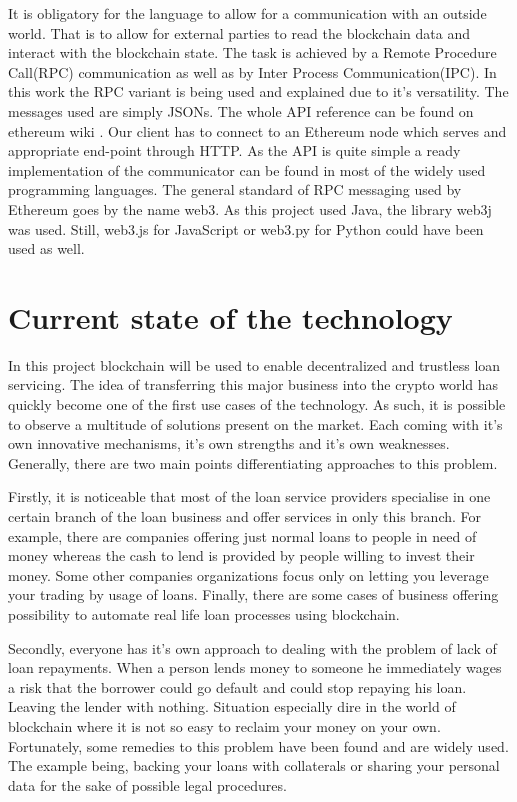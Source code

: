 \documentclass[a4paper,12pt,twoside,openany]{report}
\begin{document}
It is obligatory for the language to allow for a communication with an outside world. That is to allow for external parties to read the blockchain data and interact with the blockchain state. The task is achieved by a Remote Procedure Call(RPC) communication as well as by Inter Process Communication(IPC). In this work the RPC variant is being used and explained due to it's versatility. The messages used are simply JSONs. The whole API reference can be found on ethereum wiki \cite{RPC}.  Our client has to connect to an Ethereum node which serves and appropriate end-point through HTTP. As the API is quite simple a ready implementation of the communicator can be found in most of the widely used programming languages. The general standard of RPC messaging used by Ethereum goes by the name web3. As this project used Java, the library web3j was used. Still, web3.js for JavaScript or web3.py for Python could have been used as well.

\chapter{Current state of the technology}

In this project blockchain will be used to enable decentralized and trustless loan servicing. The idea of transferring this major business into the crypto world has quickly become one of the first use cases of the technology. As such, it is possible to observe a multitude of solutions present on the market. Each coming with it's own innovative mechanisms, it's own strengths and it's own weaknesses. Generally, there are two main points differentiating approaches to this problem. 

Firstly, it is noticeable that most of the loan service providers specialise in one certain branch of the loan business and offer services in only this branch. For example, there are companies offering just normal loans to people in need of money whereas the cash to lend is provided by people willing to invest their money. Some other companies organizations focus only on letting you leverage your trading by usage of loans. Finally, there are some cases of business offering possibility to automate real life loan processes using blockchain.     

Secondly, everyone has it's own approach to dealing with the problem of lack of loan repayments. When a person lends money to someone he immediately wages a risk that the borrower could go default and could stop repaying his loan. Leaving the lender with nothing. Situation especially dire in the world of blockchain where it is not so easy to reclaim your money on your own. Fortunately, some remedies to this problem have been found and are widely used. The example being, backing your loans with collaterals or sharing your personal data for the sake of possible legal procedures.
\end{document}

